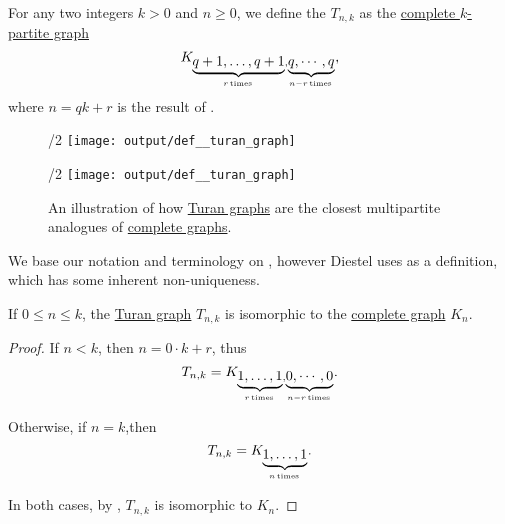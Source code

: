 \begin{definition}\label{def:turan_graph}\mimprovised
  For any two integers \( k > 0 \) and \( n \geq 0 \), we define the  \( T_{n,k} \) as the \hyperref[def:complete_multipartite_graph]{complete \( k \)-partite graph}
  \begin{equation*}
    K_{\underbrace{q+1,\ldots,q+1}_{r \T*{times}},\underbrace{q,\cdots,q}_{n - r \T*{times}}},
  \end{equation*}
  where \( n = qk + r \) is the result of .

  \begin{figure}[!ht]
    \begin{subcaptionblock}{\textwidth/2}
      \centering
      \texttt{[image: output/def\_\_turan\_graph]}
      \caption{\( K_5 \)}\label{fig:def:turan_graph/k5}
    \end{subcaptionblock}
    \hfill
    \begin{subcaptionblock}{\textwidth/2}
      \centering
      \texttt{[image: output/def\_\_turan\_graph]}
      \caption{\( T_{5,3} \)}\label{fig:def:turan_graph/t52}
    \end{subcaptionblock}
    \caption{An illustration of how \hyperref[def:turan_graph]{Turan graphs} are the closest multipartite analogues of \hyperref[def:complete_graph]{complete graphs}.}\label{fig:def:turan_graph}
  \end{figure}
\end{definition}
\begin{comments}
  \item We base our notation and terminology on \cite[165]{Diestel2005}, however Diestel uses  as a definition, which has some inherent non-uniqueness.
\end{comments}

\begin{proposition}\label{thm:small_turan_graph}
  If \( 0 \leq n \leq k \), the \hyperref[def:turan_graph]{Turan graph} \( T_{n,k} \) is isomorphic to the \hyperref[def:complete_graph]{complete graph} \( K_n \).
\end{proposition}
\begin{proof}
  If \( n < k \), then \( n = 0 \cdot k + r \), thus
  \begin{equation*}
    T_{n,k} = K_{\underbrace{1,\ldots,1}_{r \T*{times}},\underbrace{0,\cdots,0}_{n - r \T*{times}}}.
  \end{equation*}

  Otherwise, if \( n = k \),then
  \begin{equation*}
    T_{n,k} = K_{\underbrace{1,\ldots,1}_{n \T*{times}}}.
  \end{equation*}

  In both cases, by , \( T_{n,k} \) is isomorphic to \( K_n \).
\end{proof}

